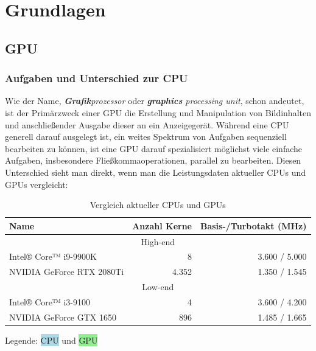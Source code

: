 \documentclass[oneside]{ausarbeitung}
\begin{document}
\chapter{Grundlagen}
\label{cha:grundlagen}

\section{GPU}
\label{sec:GPU}

\subsection{Aufgaben und Unterschied zur CPU}
\label{sub:GPU_tasks}
Wie der Name, \textit{\textbf{Grafik}prozessor} oder \textit{\textbf{graphics} processing unit}, schon andeutet, ist der Primärzweck einer \ac{GPU} die Erstellung und Manipulation von Bildinhalten und anschließender Ausgabe dieser an ein Anzeigegerät. Während eine \ac{CPU} generell darauf ausgelegt ist, ein weites Spektrum von Aufgaben sequenziell bearbeiten zu können, ist eine \ac{GPU} darauf spezialisiert möglichst viele einfache Aufgaben, insbesondere Fließkommaoperationen, parallel zu bearbeiten. Diesen Unterschied sieht man direkt, wenn man die Leistungsdaten aktueller \ac{CPU}s und \ac{GPU}s vergleicht:

\begin{table}
\begin{center}
\begin{tabular}{ |l|r|r| }
    \hline
    Name & Anzahl Kerne & Basis-/Turbotakt (MHz) \\
    \hline
    \multicolumn{3}{|c|}{High-end} \\
    \hline
    \rowcolor{lightblue}
    Intel® Core™ i9-9900K \cite{intel:i9_9900k} & 8 & 3.600 / 5.000 \\
    \rowcolor{lightgreen}
    NVIDIA GeForce RTX 2080Ti \cite{nvidia:rtx_2080ti} & 4.352 & 1.350 / 1.545 \\
    \hline
    \multicolumn{3}{|c|}{Low-end} \\
    \hline
    \rowcolor{lightblue}
    Intel® Core™ i3-9100 \cite{intel:i3_9100} & 4 & 3.600 / 4.200 \\
    \rowcolor{lightgreen}
    NVIDIA GeForce GTX 1650 \cite{nvidia:gtx_1650} & 896 & 1.485 / 1.665 \\
    \hline
\end{tabular}
Legende: \colorbox{lightblue}{\ac{CPU}} und \colorbox{lightgreen}{\ac{GPU}}
\end{center}
\caption{Vergleich aktueller CPUs und GPUs}
\end{table}
\end{document}
